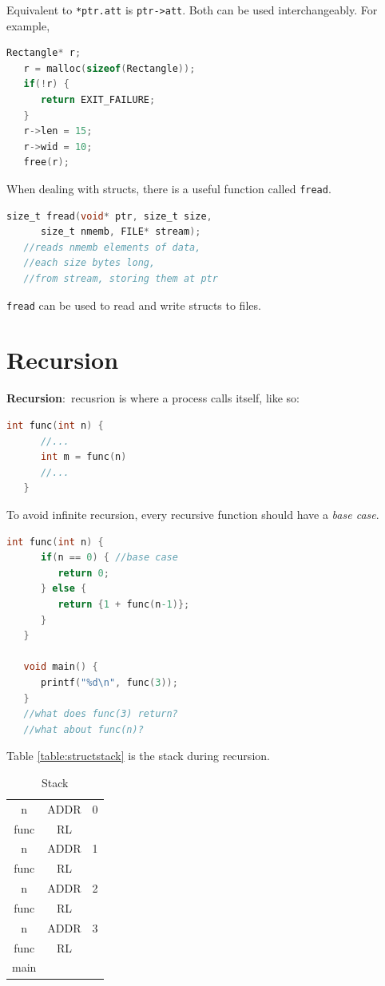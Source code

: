 \documentclass[nobib]{tufte-handout}
\newcommand{\defn}[2]{\noindent\textbf{#1}:\ #2}
\begin{document}
Equivalent to \texttt{*ptr.att} is \texttt{ptr->att}. Both can be used 
interchangeably. For example, 
\begin{lstlisting}[language=C,caption=-> and malloc]
   Rectangle* r;
   r = malloc(sizeof(Rectangle));
   if(!r) {
      return EXIT_FAILURE;
   }
   r->len = 15;
   r->wid = 10;
   free(r);
\end{lstlisting}
When dealing with structs, there is a useful function called \texttt{fread}. 
\begin{lstlisting}[language=C,caption=fread]
   size_t fread(void* ptr, size_t size, 
      size_t nmemb, FILE* stream);
   //reads nmemb elements of data, 
   //each size bytes long, 
   //from stream, storing them at ptr
\end{lstlisting}
\texttt{fread} can be used to read and write structs to files.

\section{Recursion}
\defn{Recursion}{recusrion is where a process calls itself}, like so:
\begin{lstlisting}[language=C,caption=recursion]
   int func(int n) {
      //...
      int m = func(n)
      //...
   }
\end{lstlisting}
To avoid infinite recursion, every recursive function should 
have a \emph{base case}. 
\begin{lstlisting}[language=C,caption=recursion]
   int func(int n) {
      if(n == 0) { //base case
         return 0;
      } else {
         return {1 + func(n-1)};
      }
   }

   void main() {
      printf("%d\n", func(3));
   }
   //what does func(3) return?
   //what about func(n)?
\end{lstlisting}
Table \ref{table:structstack} is the stack during recursion. 
\begin{table}[h]
   \centering
   \caption{Stack}
   \label{table:stackrecur}
   \begin{tabular}{|c c c|}
      \hline
      n & ADDR & 0 \\
      func & RL & \\
      \hline
      n & ADDR & 1 \\
      func & RL & \\
      \hline
      n & ADDR & 2 \\
      func & RL & \\
      \hline
      n & ADDR & 3 \\
      func & RL & \\
      \hline
      main & & \\
      \hline
   \end{tabular}
\end{table}
\end{document}
